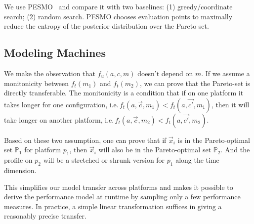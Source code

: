 \begin{figure}
\begin{subfigure}{0.45\textwidth}
  \end{subfigure}
\end{figure}

We use PESMO~\cite{hernandez2016predictive} and compare it with two baselines:
(1) greedy/coordinate search; (2) random search. PESMO chooses evaluation points
to maximally reduce the entropy of the posterior distribution over the Pareto
set.


\subsection{Modeling Machines}
\label{sec:performance-transfer}

We make the observation that $f_u(a, c, m)$ doesn't depend on $m$. If we assume
a monitonicity between $f_t(m_1)$ and $f_t(m_2)$, we can prove that the
Pareto-set is directly transferable. The monitonicity is a condition that if on
one platform it takes longer for one configuration,
i.e.\,$f_t(a, \vec{c}, m_1) < f_t(a, \vec{c'}, m_1)$, then it will take longer
on another platform, i.e.\,$f_t(a, \vec{c}, m_2) < f_t(a, \vec{c'}, m_2)$.

Based on these two assumption, one can prove that if $\vec{x}_i$ is in the
Pareto-optimal set $\mathbb{P}_1$ for platform $p_1$, then $\vec{x}_i$ will also
be in the Pareto-optimal set $\mathbb{P}_2$. And the profile on $p_2$ will be a
stretched or shrunk version for $p_1$ along the time dimension.

This simplifies our model transfer across platforms and makes it possible to
derive the performance model at runtime by sampling only a few performance
measures. In practice, a simple linear transformation suffices in giving a
reasonably precise transfer.

